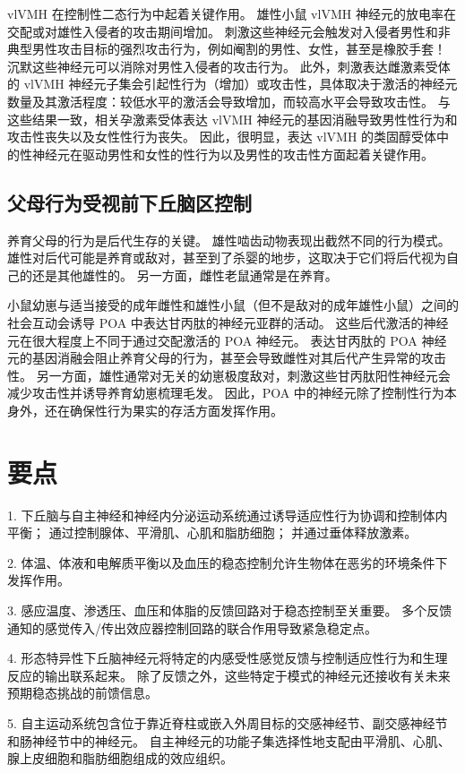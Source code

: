 vlVMH 在控制性二态行为中起着关键作用。 雄性小鼠 vlVMH 神经元的放电率在交配或对雄性入侵者的攻击期间增加。 刺激这些神经元会触发对入侵者男性和非典型男性攻击目标的强烈攻击行为，例如阉割的男性、女性，甚至是橡胶手套！ 沉默这些神经元可以消除对男性入侵者的攻击行为。 此外，刺激表达雌激素受体的 vlVMH 神经元子集会引起性行为（增加）或攻击性，具体取决于激活的神经元数量及其激活程度：较低水平的激活会导致增加，而较高水平会导致攻击性。 与这些结果一致，相关孕激素受体表达 vlVMH 神经元的基因消融导致男性性行为和攻击性丧失以及女性性行为丧失。 因此，很明显，表达 vlVMH 的类固醇受体中的性神经元在驱动男性和女性的性行为以及男性的攻击性方面起着关键作用。

\subsection{父母行为受视前下丘脑区控制}

养育父母的行为是后代生存的关键。 雄性啮齿动物表现出截然不同的行为模式。 雄性对后代可能是养育或敌对，甚至到了杀婴的地步，这取决于它们将后代视为自己的还是其他雄性的。 另一方面，雌性老鼠通常是在养育。

小鼠幼崽与适当接受的成年雌性和雄性小鼠（但不是敌对的成年雄性小鼠）之间的社会互动会诱导 POA 中表达甘丙肽的神经元亚群的活动。 这些后代激活的神经元在很大程度上不同于通过交配激活的 POA 神经元。 表达甘丙肽的 POA 神经元的基因消融会阻止养育父母的行为，甚至会导致雌性对其后代产生异常的攻击性。 另一方面，雄性通常对无关的幼崽极度敌对，刺激这些甘丙肽阳性神经元会减少攻击性并诱导养育幼崽梳理毛发。 因此，POA 中的神经元除了控制性行为本身外，还在确保性行为果实的存活方面发挥作用。

\section{要点}
1. 下丘脑与自主神经和神经内分泌运动系统通过诱导适应性行为协调和控制体内平衡； 通过控制腺体、平滑肌、心肌和脂肪细胞； 并通过垂体释放激素。 

2. 体温、体液和电解质平衡以及血压的稳态控制允许生物体在恶劣的环境条件下发挥作用。 

3. 感应温度、渗透压、血压和体脂的反馈回路对于稳态控制至关重要。 多个反馈通知的感觉传入/传出效应器控制回路的联合作用导致紧急稳定点。 

4. 形态特异性下丘脑神经元将特定的内感受性感觉反馈与控制适应性行为和生理反应的输出联系起来。 除了反馈之外，这些特定于模式的神经元还接收有关未来预期稳态挑战的前馈信息。 

5. 自主运动系统包含位于靠近脊柱或嵌入外周目标的交感神经节、副交感神经节和肠神经节中的神经元。 自主神经元的功能子集选择性地支配由平滑肌、心肌、腺上皮细胞和脂肪细胞组成的效应组织。 

